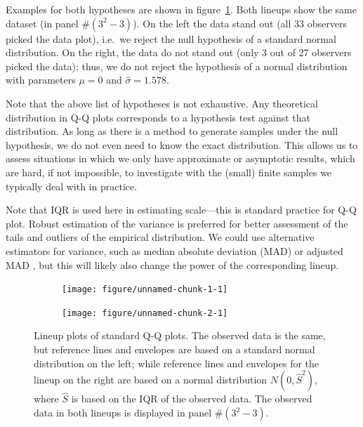 \documentclass{article}\usepackage[]{graphicx}\usepackage[]{color}
\newenvironment{knitrout}{}{} %
\newcommand{\alnote}[1]{\todo[inline,color=green!40]{#1}}
\begin{document}

Examples for both hypotheses are shown in figure~\ref{fig:lps}. Both lineups show the same dataset (in panel \#$(3^2-3)$). On the left the data stand out (all 33 observers picked the data plot), i.e.~we reject the null hypothesis of a standard normal distribution. On the right, the data do not stand out (only 3 out of 27 observers picked the data); thus, we do not reject the hypothesis of a normal distribution with parameters $\mu=0$ and $\widehat{\sigma}=1.578$. 

Note that the above list of hypotheses is not exhaustive. Any theoretical distribution in Q-Q plots corresponds to a  hypothesis test against that distribution. As long as there is a method to generate samples under the null hypothesis, we do not even need to know the exact distribution. This allows us to assess situations in which we only have approximate or asymptotic results, which are hard, if not impossible, to investigate with the (small) finite samples we typically deal with in practice.

Note that IQR is used here in estimating scale---this is standard practice for Q-Q plot. Robust estimation of the variance is preferred for better assessment of the tails and outliers of the empirical distribution. We could use alternative estimators for variance, such as median absolute deviation (MAD) or adjusted MAD \citep{rousseeuw}, but this will likely also change the power of the corresponding lineup.

\begin{figure}[hbt]

\begin{subfigure}{0.5\textwidth}
\begin{knitrout}
\color{fgcolor}
\texttt{[image: figure/unnamed-chunk-1-1]} 

\end{knitrout}
\end{subfigure}
\begin{subfigure}{0.5\textwidth}
\begin{knitrout}
\color{fgcolor}
\texttt{[image: figure/unnamed-chunk-2-1]} 

\end{knitrout}
\end{subfigure}
\caption{\label{fig:lps} Lineup plots of standard Q-Q plots. The observed data is the same, but  reference lines and envelopes are based on a standard normal distribution on the left; while  reference lines and envelopes for the lineup on the right are based on a normal distribution $N(0, \widehat{S}^2)$, where $\widehat{S}$ is based on the IQR of the observed data.
The observed data in both lineups is displayed in panel \#$(3^2 - 3)$. }
\end{figure}
\end{document}
